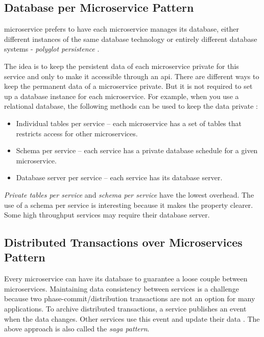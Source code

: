 \subsection{Database per Microservice Pattern}
\label{subse:database_per_service}

\acrshort{microservice} prefers to have each microservice manages its database, either different instances of the same database technology or entirely different database systems - \emph{polyglot persistence} \cite{LewisMicroservicesManagement}.

The idea is to keep the persistent data of each microservice private for this service and only to make it accessible through an \acrshort{api}.
There are different ways to keep the permanent data of a microservice private. But it is not required to set up a database instance for each microservice. For example, when you use a relational database, the following methods can be used to keep the data private \cite{RichardsonMicroservicesService}:
\begin{itemize}
    \item Individual tables per service -- each microservice has a set of tables that restricts access for other microservices.
    \item Schema per service -- each service has a private database schedule for a given microservice.
    \item Database server per service -- each service has its database server.
\end{itemize}

\emph{Private tables per service} and \emph{schema per service} have the lowest overhead. The use of a schema per service is interesting because it makes the property clearer. Some high throughput services may require their database server.

\subsection{Distributed Transactions over Microservices Pattern}
\label{subse:sagas}

Every microservice can have its database to guarantee a loose couple between microservices. Maintaining data consistency between services is a challenge because two phase-commit/distribution transactions are not an option for many applications. To archive distributed transactions, a service publishes an event when the data changes. Other services use this event and update their data \cite{RichardsonMicroservicesSagas}. The above approach is also called the \emph{saga pattern}.

